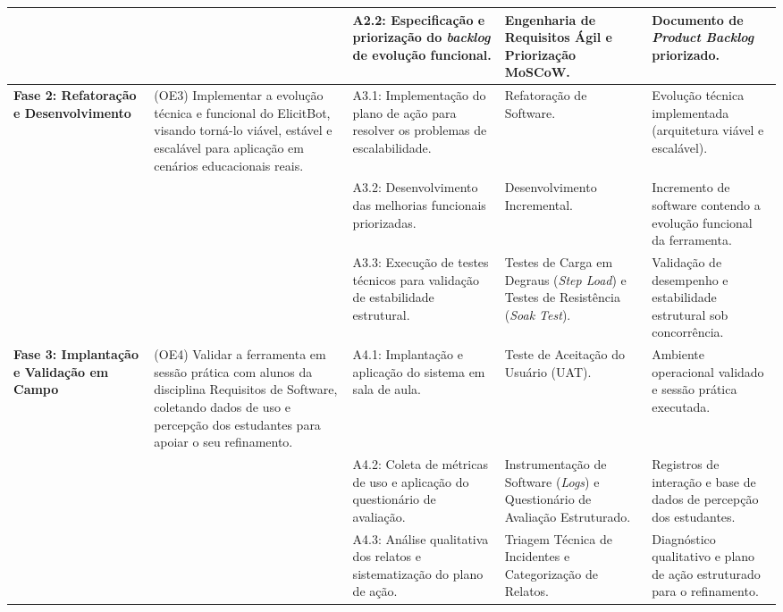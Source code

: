 {\begin{xltabular}{\textwidth}{|p{1.8cm}|p{4.2cm}|X|X|X|}
    & & 
    A2.2: Especificação e priorização do \textit{backlog} de evolução funcional. & 
    Engenharia de Requisitos Ágil e Priorização MoSCoW. & 
    Documento de \textit{Product Backlog} priorizado. \\
    \midrule
    
    \textbf{Fase 2: Refatoração e Desenvolvimento} & 
    (OE3) Implementar a evolução técnica e funcional do ElicitBot, visando torná-lo viável, estável e escalável para aplicação em cenários educacionais reais. & 
    A3.1: Implementação do plano de ação para resolver os problemas de escalabilidade. & 
    Refatoração de Software. & 
    Evolução técnica implementada (arquitetura viável e escalável). \\
    
    & & 
    A3.2: Desenvolvimento das melhorias funcionais priorizadas. & 
    Desenvolvimento Incremental. & 
    Incremento de software contendo a evolução funcional da ferramenta. \\
    
    & & 
    A3.3: Execução de testes técnicos para validação de estabilidade estrutural. & 
    Testes de Carga em Degraus (\textit{Step Load}) e Testes de Resistência (\textit{Soak Test}). & 
    Validação de desempenho e estabilidade estrutural sob concorrência. \\
    \midrule
    
    \textbf{Fase 3: Implantação e Validação em Campo} & 
    (OE4) Validar a ferramenta em sessão prática com alunos da disciplina Requisitos de Software, coletando dados de uso e percepção dos estudantes para apoiar o seu refinamento. & 
    A4.1: Implantação e aplicação do sistema em sala de aula. & 
    Teste de Aceitação do Usuário (UAT). & 
    Ambiente operacional validado e sessão prática executada. \\
    
    & & 
    A4.2: Coleta de métricas de uso e aplicação do questionário de avaliação. & 
    Instrumentação de Software (\textit{Logs}) e Questionário de Avaliação Estruturado. & 
    Registros de interação e base de dados de percepção dos estudantes. \\
    
    & & 
    A4.3: Análise qualitativa dos relatos e sistematização do plano de ação. & 
    Triagem Técnica de Incidentes e Categorização de Relatos. & 
    Diagnóstico qualitativo e plano de ação estruturado para o refinamento. \\
    

\end{xltabular}}
